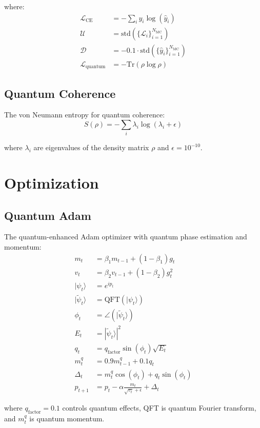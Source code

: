 \documentclass{article}
\begin{document}
where:
\begin{align*}
\mathcal{L}_{\text{CE}} &= -\sum_{i} y_i \log(\hat{y}_i) \\
\mathcal{U} &= \text{std}(\{\mathcal{L}_i\}_{i=1}^{N_{\text{MC}}}) \\
\mathcal{D} &= -0.1 \cdot \text{std}(\{\hat{y}_i\}_{i=1}^{N_{\text{MC}}}) \\
\mathcal{L}_{\text{quantum}} &= -\text{Tr}(\rho\log\rho)
\end{align*}

\subsection{Quantum Coherence}
The von Neumann entropy for quantum coherence:
\begin{equation}
S(\rho) = -\sum_i \lambda_i \log(\lambda_i + \epsilon)
\end{equation}

where $\lambda_i$ are eigenvalues of the density matrix $\rho$ and $\epsilon=10^{-10}$.

\section{Optimization}

\subsection{Quantum Adam}
The quantum-enhanced Adam optimizer with quantum phase estimation and momentum:
\begin{align*}
m_t &= \beta_1 m_{t-1} + (1-\beta_1)g_t \\
v_t &= \beta_2 v_{t-1} + (1-\beta_2)g_t^2 \\
|\psi_t\rangle &= e^{i p_t} \\
|\tilde{\psi}_t\rangle &= \text{QFT}(|\psi_t\rangle) \\
\phi_t &= \angle(|\tilde{\psi}_t\rangle) \\
E_t &= |\tilde{\psi}_t\rangle|^2 \\
q_t &= q_{\text{factor}} \sin(\phi_t) \sqrt{E_t} \\
m^q_t &= 0.9 m^q_{t-1} + 0.1 q_t \\
\Delta_t &= m^q_t \cos(\phi_t) + q_t \sin(\phi_t) \\
p_{t+1} &= p_t - \alpha\frac{m_t}{\sqrt{v_t} + \epsilon} + \Delta_t
\end{align*}

where $q_{\text{factor}}=0.1$ controls quantum effects, QFT is quantum Fourier transform, and $m^q_t$ is quantum momentum.
\end{document}
